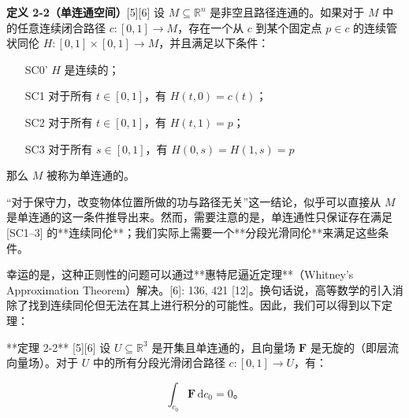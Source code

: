 \textbf{定义 2-2（单连通空间）}[5][6]  设 \(M \subseteq \mathbb{R}^n\) 是非空且路径连通的。如果对于 \(M\) 中的任意连续闭合路径 \(c: [0, 1] \to M\)，存在一个从 \(c\) 到某个固定点 \(p \in c\) 的连续管状同伦 \(H: [0, 1] \times [0, 1] \to M\)，并且满足以下条件：

\begin{itemize}
\item [SC0'] \(H\) 是连续的；
\item [SC1] 对于所有 \(t \in [0, 1]\)，有 \(H(t, 0) = c(t)\)；
\item [SC2] 对于所有 \(t \in [0, 1]\)，有 \(H(t, 1) = p\)；
\item [SC3] 对于所有 \(s \in [0, 1]\)，有 \(H(0, s) = H(1, s) = p\)
\end{itemize}

那么 \(M\) 被称为单连通的。

“对于保守力，改变物体位置所做的功与路径无关”这一结论，似乎可以直接从 \(M\) 是单连通的这一条件推导出来。然而，需要注意的是，单连通性只保证存在满足 [SC1–3] 的**连续同伦**；我们实际上需要一个**分段光滑同伦**来满足这些条件。

幸运的是，这种正则性的问题可以通过**惠特尼逼近定理**（Whitney's Approximation Theorem）解决。[6]: 136, 421 [12]。换句话说，高等数学的引入消除了找到连续同伦但无法在其上进行积分的可能性。因此，我们可以得到以下定理：

**定理 2-2** [5][6]  
设 \(U \subseteq \mathbb{R}^3\) 是开集且单连通的，且向量场 \(\mathbf{F}\) 是无旋的（即层流向量场）。对于 \(U\) 中的所有分段光滑闭合路径 \(c: [0, 1] \to U\)，有：

\[
\int_{c_0} \mathbf{F} \, \mathrm{d}c_0 = 0。
\]